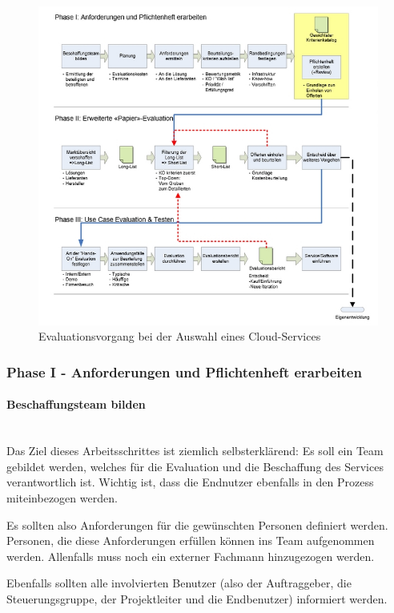 \documentclass[a4paper, 11pt]{article}
\begin{document}
\begin{figure}[htb]
	\centering
	\includegraphics[keepaspectratio=true,height=25\baselineskip]{evaluation.jpg}
	\caption{Evaluationsvorgang bei der Auswahl eines Cloud-Services}
	\label{fig:eval}
\end{figure}

\subsubsection{Phase I - Anforderungen und Pflichtenheft erarbeiten}

\paragraph{Beschaffungsteam bilden}\mbox{}\\
Das Ziel dieses Arbeitsschrittes ist ziemlich selbsterklärend: Es soll ein Team gebildet werden, welches für die Evaluation und die Beschaffung des Services verantwortlich ist. Wichtig ist, dass die Endnutzer ebenfalls in den Prozess miteinbezogen werden.

Es sollten also Anforderungen für die gewünschten Personen definiert werden. Personen, die diese Anforderungen erfüllen können ins Team aufgenommen werden. Allenfalls muss noch ein externer Fachmann hinzugezogen werden.

Ebenfalls sollten alle involvierten Benutzer (also der Auftraggeber, die Steuerungsgruppe, der Projektleiter und die Endbenutzer) informiert werden.
\end{document}
